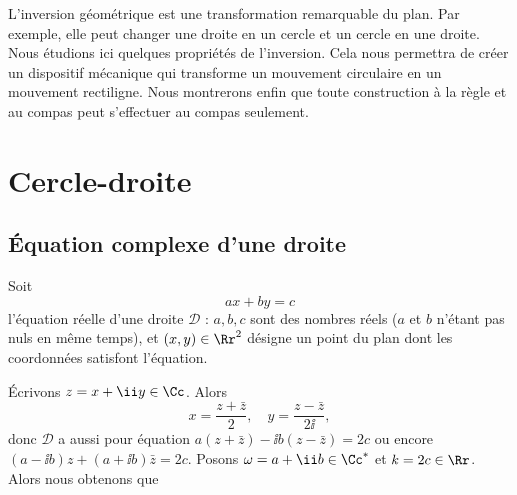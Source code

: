 \documentclass[11pt,class=report,crop=false]{standalone}
\begin{document}
\newcommand{\inversion}{i}
\renewcommand{\vec}[1]{\overrightarrow{#1}}




L'inversion géométrique est une transformation remarquable du plan. Par exemple, elle peut changer une droite en un cercle
et un cercle en une droite. Nous étudions ici quelques propriétés de l'inversion. Cela nous permettra de créer un dispositif mécanique qui transforme un mouvement circulaire en un mouvement rectiligne. Nous montrerons enfin que toute construction à la règle et au compas peut s'effectuer au compas seulement.

\section{Cercle-droite}

\subsection{\'Equation complexe d'une droite}

Soit 
$$ax+by=c$$ 
l'équation réelle d'une droite $\mathcal{D}$ : $a,b,c$ sont des nombres réels
($a$ et $b$ n'étant pas nuls en même temps),
et $(x,y) \in \Rr^2$ désigne un point du plan dont les coordonnées satisfont l'équation.



\'Ecrivons $z=x+\ii y \in \Cc$. Alors 
$$x = \frac{z+\bar z}{2}, \quad y = \frac{z - \bar z}{2\ii},$$
donc $\mathcal{D}$ a aussi pour équation
$a(z+\bar z) -\ii b(z-\bar z)=2c$ ou encore $(a-\ii b)z+(a+\ii b)\bar z = 2c$.
Posons $\omega = a+\ii b \in \Cc^*$ et $k=2c \in \Rr$. Alors nous obtenons que\\

\end{document}
